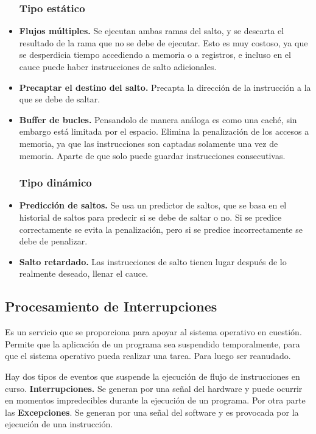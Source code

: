 \documentclass{article}
\begin{document}
\begin{itemize}
      \subsubsection*{Tipo est\'{a}tico}
      \item \textbf{Flujos m\'{u}ltiples.}
            Se ejecutan ambas ramas del salto, y se descarta el resultado de
            la rama que no se debe de ejecutar. Esto es muy costoso, ya que
            se desperdicia tiempo accediendo a memoria o a registros, e incluso
            en el cauce puede haber instrucciones de salto adicionales.
      \item \textbf{Precaptar el destino del salto.}
            Precapta la direcci\'{o}n de la instrucci\'{o}n a la que se debe de
            saltar.
      \item \textbf{Buffer de bucles.}
            Pensandolo de manera an\'{a}loga es como una cach\'{e}, sin embargo
            est\'{a} limitada por el espacio. Elimina la penalizaci\'{o}n de los
            accesos a memoria, ya que las instrucciones son captadas solamente
            una vez de memoria. Aparte de que solo puede guardar instrucciones
            consecutivas.

            \subsubsection*{Tipo din\'{a}mico}
      \item \textbf{Predicci\'{o}n de saltos.}
            Se usa un predictor de saltos, que se basa en el historial de saltos
            para predecir si se debe de saltar o no. Si se predice correctamente
            se evita la penalizaci\'{o}n, pero si se predice incorrectamente se
            debe de penalizar.
      \item \textbf{Salto retardado.}
            Las instrucciones de salto tienen lugar despu\'{e}s de lo realmente
            deseado, llenar el cauce.
\end{itemize}

\subsection*{Procesamiento de Interrupciones}
Es un servicio que se proporciona para apoyar al sistema operativo en cuesti\'{o}n.
Permite que la aplicaci\'{o}n de un programa sea suspendido temporalmente, para
que el sistema operativo pueda realizar una tarea. Para luego ser reanudado. 

Hay dos tipos de eventos que suspende la ejecuci\'{o}n de flujo de instrucciones
en curso. \textbf{Interrupciones.}
Se generan por una se\~{n}al del hardware y puede ocurrir en momentos impredecibles
durante la ejecuci\'{o}n de un programa.
Por otra parte las \textbf{Excepciones}.
Se generan por una se\~{n}al del software y es provocada por la ejecuci\'{o}n de
una instrucci\'{o}n.




\end{document}
